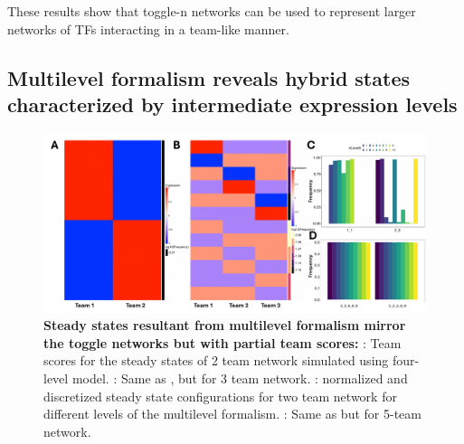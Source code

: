 \documentclass[11pt,a4paper]{article}
\theoremstyle{definition}
\theoremstyle{remark}
\begin{document}
These results show that toggle-n networks can be used to represent larger networks of TFs interacting in a team-like manner.

\subsection{Multilevel formalism reveals hybrid states characterized by intermediate expression levels}

\begin{figure}[!ht]
    \centering
    \begin{subfigure}[c]{\textwidth}
        \label{exp-mlvl-team2}
    \end{subfigure}
    \begin{subfigure}[c]{\textwidth}
        \label{exp-mlvl-team3}
    \end{subfigure}
    \begin{subfigure}[c]{\textwidth}
        \label{ss-mlvl-team3}
    \end{subfigure}
    \begin{subfigure}[c]{\textwidth}
        \label{ss-mlvl-team5}
    \end{subfigure}
    \includegraphics[width=\textwidth]{figures/FigureX}
    \caption{\textbf{Steady states resultant from multilevel formalism mirror the toggle networks but with partial team scores:} : Team scores for the steady states of 2 team network simulated using four-level model. : Same as , but for 3 team network. : normalized and discretized steady state configurations for two team network for different levels of the multilevel formalism. : Same as  but for 5-team network.}
    \label{multilvl-team}
\end{figure}
\end{document}

